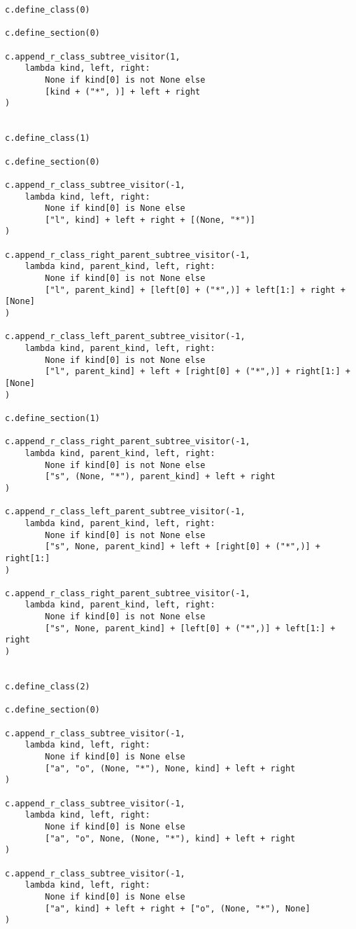 \documentclass[final]{article}
\theoremstyle{definition}
\theoremstyle{definition}
\theoremstyle{remark}
\begin{document}
\begin{lstlisting}
c.define_class(0)

c.define_section(0)

c.append_r_class_subtree_visitor(1,
    lambda kind, left, right:
        None if kind[0] is not None else
        [kind + ("*", )] + left + right
)


c.define_class(1)

c.define_section(0)

c.append_r_class_subtree_visitor(-1,
    lambda kind, left, right:
        None if kind[0] is None else
        ["l", kind] + left + right + [(None, "*")]
)

c.append_r_class_right_parent_subtree_visitor(-1,
    lambda kind, parent_kind, left, right:
        None if kind[0] is not None else
        ["l", parent_kind] + [left[0] + ("*",)] + left[1:] + right + [None]
)

c.append_r_class_left_parent_subtree_visitor(-1,
    lambda kind, parent_kind, left, right:
        None if kind[0] is not None else
        ["l", parent_kind] + left + [right[0] + ("*",)] + right[1:] + [None]
)

c.define_section(1)

c.append_r_class_right_parent_subtree_visitor(-1,
    lambda kind, parent_kind, left, right:
        None if kind[0] is not None else
        ["s", (None, "*"), parent_kind] + left + right
)

c.append_r_class_left_parent_subtree_visitor(-1,
    lambda kind, parent_kind, left, right:
        None if kind[0] is not None else
        ["s", None, parent_kind] + left + [right[0] + ("*",)] + right[1:]
)

c.append_r_class_right_parent_subtree_visitor(-1,
    lambda kind, parent_kind, left, right:
        None if kind[0] is not None else
        ["s", None, parent_kind] + [left[0] + ("*",)] + left[1:] + right
)


c.define_class(2)

c.define_section(0)

c.append_r_class_subtree_visitor(-1,
    lambda kind, left, right:
        None if kind[0] is None else
        ["a", "o", (None, "*"), None, kind] + left + right
)

c.append_r_class_subtree_visitor(-1,
    lambda kind, left, right:
        None if kind[0] is None else
        ["a", "o", None, (None, "*"), kind] + left + right
)

c.append_r_class_subtree_visitor(-1,
    lambda kind, left, right:
        None if kind[0] is None else
        ["a", kind] + left + right + ["o", (None, "*"), None]
)


\end{lstlisting}
\end{document}
